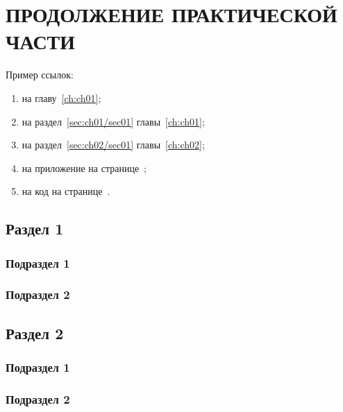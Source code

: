 \chapter{\label{ch:ch03}ПРОДОЛЖЕНИЕ ПРАКТИЧЕСКОЙ ЧАСТИ}

Пример ссылок:
\begin{enumerate}
\item на главу~\ref{ch:ch01};
\item на раздел~\ref{sec:ch01/sec01} главы~\ref{ch:ch01};
\item на раздел~\ref{sec:ch02/sec01} главы~\ref{ch:ch02};
\item на приложение на странице~\pageref{appendix1};
\item на код на странице~\pageref{code:pi-example}.
\end{enumerate}

\section{\label{sec:ch03/sec01}Раздел 1}

\subsection{\label{subsec:ch03/sec01/sub01}Подраздел 1}

\subsection{\label{subsec:ch03/sec01/sub02}Подраздел 2}

\section{\label{sec:ch03/sec02}Раздел 2}

\subsection{\label{subsec:ch03/sec02/sub01}Подраздел 1}

\subsection{\label{subsec:ch03/sec02/sub02}Подраздел 2}

